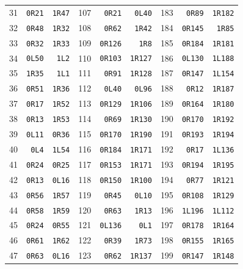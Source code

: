 {\begin{longtable}{rrr@{\hspace{8mm}}rrr@{\hspace{8mm}}rrr}
31 & \texttt{0R21} & \texttt{1R47} & 107 & \texttt{0R21} & \texttt{0L40} & 183 & \texttt{0R89} & \texttt{1R182}\\
32 & \texttt{0R48} & \texttt{1R32} & 108 & \texttt{0R62} & \texttt{1R42} & 184 & \texttt{0R145} & \texttt{1R85}\\
33 & \texttt{0R32} & \texttt{1R33} & 109 & \texttt{0R126} & \texttt{1R8} & 185 & \texttt{0R184} & \texttt{1R181}\\
34 & \texttt{0L50} & \texttt{1L2} & 110 & \texttt{0R103} & \texttt{1R127} & 186 & \texttt{0L130} & \texttt{1L188}\\
35 & \texttt{1R35} & \texttt{1L1} & 111 & \texttt{0R91} & \texttt{1R128} & 187 & \texttt{0R147} & \texttt{1L154}\\
36 & \texttt{0R51} & \texttt{1R36} & 112 & \texttt{0L40} & \texttt{0L96} & 188 & \texttt{0R12} & \texttt{1R187}\\
37 & \texttt{0R17} & \texttt{1R52} & 113 & \texttt{0R129} & \texttt{1R106} & 189 & \texttt{0R164} & \texttt{1R180}\\
38 & \texttt{0R13} & \texttt{1R53} & 114 & \texttt{0R69} & \texttt{1R130} & 190 & \texttt{0R170} & \texttt{1R192}\\
39 & \texttt{0L11} & \texttt{0R36} & 115 & \texttt{0R170} & \texttt{1R190} & 191 & \texttt{0R193} & \texttt{1R194}\\
40 & \texttt{0L4} & \texttt{1L54} & 116 & \texttt{0R184} & \texttt{1R171} & 192 & \texttt{0R17} & \texttt{1L136}\\
41 & \texttt{0R24} & \texttt{0R25} & 117 & \texttt{0R153} & \texttt{1R171} & 193 & \texttt{0R194} & \texttt{1R195}\\
42 & \texttt{0R13} & \texttt{0L16} & 118 & \texttt{0R150} & \texttt{1R100} & 194 & \texttt{0R77} & \texttt{1R121}\\
43 & \texttt{0R56} & \texttt{1R57} & 119 & \texttt{0R45} & \texttt{0L10} & 195 & \texttt{0R108} & \texttt{1R129}\\
44 & \texttt{0R58} & \texttt{1R59} & 120 & \texttt{0R63} & \texttt{1R13} & 196 & \texttt{1L196} & \texttt{1L112}\\
45 & \texttt{0R24} & \texttt{0R55} & 121 & \texttt{0L136} & \texttt{0L1} & 197 & \texttt{0R178} & \texttt{1R164}\\
46 & \texttt{0R61} & \texttt{1R62} & 122 & \texttt{0R39} & \texttt{1R73} & 198 & \texttt{0R155} & \texttt{1R165}\\
47 & \texttt{0R63} & \texttt{0L16} & 123 & \texttt{0R62} & \texttt{1R137} & 199 & \texttt{0R147} & \texttt{1R148}\\

\end{longtable}}
